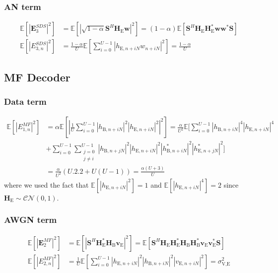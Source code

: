 \documentclass[12pt, draftclsnofoot, onecolumn]{IEEEtran}
\newcommand{\module}[1]{\left|#1\right|}
\newcommand{\EX}[1]{\mathbb{E} \left[#1\right]}%
\newcommand{\HE}{\textbf{H}_{\text{E}}}
\newcommand{\HB}{\textbf{H}_{\text{B}}}
\newcommand{\ve}{\textbf{v}_{\text{E}}}
\newcommand{\spread}{\textbf{S}}
\newcommand{\w}{\textbf{w}}
\begin{document}
\subsubsection{AN term}\label{sec:an-term-app-1}
\begin{equation}
	\begin{split}
		\EX{|\textbf{E}_{3}^{SDS}|^2} &=  \EX{\module{\sqrt{1-\alpha}\spread^H \HE \w}^2} =(1-\alpha)\EX{\spread^H \HE\textbf{H}^*_{\text{E}} \w\w^* \spread } \\
		\EX{|E_{3,n}^{SDS}|^2}  &= \frac{1-\alpha}{U} \EX{\sum_{i=0}^{U-1} |h_{\text{E}, n + iN}w_{n + iN}|^2} = \frac{1-\alpha}{U}
	\end{split}
	\label{eq:appA:an_eve_filt0-app}
\end{equation}

\subsection{MF Decoder}\label{sec:matched-filtering-app}
\subsubsection{Data term}\label{sec:data-term-app-2}
\begin{equation}
\begin{split}
	\EX{|E_{1,n}^{MF}|^2} &= \alpha \EX{\left|\frac{1}{U}\sum_{i=0}^{U-1} \left| h_{\text{B}, n + iN}\right|^2 \left| h_{\text{E}, n + iN}\right|^2\right|^2}
	=\frac{\alpha}{U^2} \mathbb{E} \Bigg[\sum_{i=0}^{U-1} \left| h_{\text{B}, n + iN}\right|^4 \left| h_{\text{E}, n + iN}\right|^4 \\
	&+ \sum_{i=0}^{U-1}\sum_{\substack{j=0 \\ j\neq i}}^{U-1}  \left| h_{\text{B}, n + jN}\right|^2 \left| h_{\text{E}, n + iN}\right|^2 \left| h^*_{\text{B}, n + iN}\right|^2 \left| h^*_{\text{E}, n + jN}\right|^2 \Bigg] \\
	&= \frac{\alpha}{U^2} \left(U.2.2 + U(U-1) \right) = \frac{\alpha (U+3)}{U}
	\end{split}
	\label{eq:data_eve_filt1-app}
\end{equation}
where we used the fact that $\EX{\left| h_{\text{E}, n + iN}\right|^2} = 1$ and $\EX{\left| h_{\text{E}, n + iN}\right|^4} = 2$ since $\HE \sim \mathcal{CN}(0,1)$.



\subsubsection{AWGN term}\label{sec:awgn-term-app-2}
\begin{equation}
	\begin{split}
		\EX{|\textbf{E}_{2}^{MF}|^2} &=  \EX{\module{\spread^H \HE^* \HB \ve}^2} =\EX{\spread^H   \HE \HE^* \HB\HB^*  \ve \ve^* \spread } \\
		\EX{|E_{2,n}^{MF}|^2} &= \frac{1}{U} \EX{\sum_{i=0}^{U-1} |h_{\text{E}, n + iN}|^2 |h_{\text{B}, n + iN}|^2 |v_{\text{E}, n + iN}|^2} = \sigma^2_{\text{V,E}}
	\end{split}
	\label{eq:noise_eve_filt1-app}
\end{equation}
\end{document}
